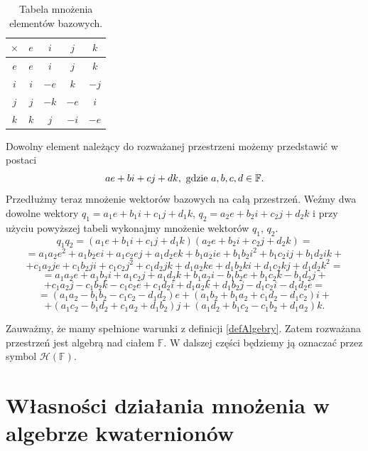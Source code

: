 \documentclass[a4paper,twoside,11pt,reqno]{mwrep}
\theoremstyle{plain} \newtheorem{twr}{Twierdzenie}
\theoremstyle{plain} \newtheorem{lem}{Lemat}
\theoremstyle{definition} \newtheorem{defi}{Definicja}
\theoremstyle{remark} \newtheorem*{wni}{Wniosek}
\theoremstyle{definition} \newtheorem{uwaga}{Uwaga}
\theoremstyle{definition}\newtheorem{prz}{Przykład}
\begin{document}
\begin{table}[h]
    \centering
      \caption{\label{table}Tabela mnożenia elementów bazowych.}
    \begin{tabular}{|c|c|c|c|c|}
        \hline
        \rowcolor{gray}$\times$ & $e$&$i$& $j$& $k$\\\hline 
         \cellcolor{gray}$e$&\cellcolor{gray!25}$e$&\cellcolor{gray!25}$i$
         &\cellcolor{gray!25}$j$&\cellcolor{gray!25}$k$\\ \hline
         \cellcolor{gray}$i$&\cellcolor{gray!25}$i$&\cellcolor{gray!25}$-e$&
         \cellcolor{gray!25}$k$&\cellcolor{gray!25}$-j$\\ \hline
         \cellcolor{gray}$j$&\cellcolor{gray!25}$j$&\cellcolor{gray!25}$-k$&\cellcolor{gray!25}$-e$&\cellcolor{gray!25}$i$\\ \hline
         \cellcolor{gray}$k$&\cellcolor{gray!25}$k$&\cellcolor{gray!25}$j$&
         \cellcolor{gray!25}$-i$&\cellcolor{gray!25}$-e$\\ \hline
    \end{tabular}

\end{table}


\noindent
Dowolny element należący do rozważanej przestrzeni możemy przedstawić w postaci
$$ae+bi+cj+dk,\textup{ gdzie }a,b,c,d\in\mathbb{F}.$$ 
Przedłużmy teraz mnożenie wektorów bazowych na całą przestrzeń. Weźmy dwa dowolne wektory 
$q_1=a_1e +b_1 i +c_1j +d_1 k$, $q_2=a_2e +b_2 i +c_2j +d_2 k$ i przy użyciu powyższej tabeli wykonajmy mnożenie wektorów $q_1$, $q_2$. 
$$q_1q_2 = (a_1e +b_1 i +c_1j +d_1 k)(a_2e +b_2 i +c_2j +d_2 k)=$$
$$=a_1a_2 e^2 +a_1b_2ei +a_1c_2ej+a_1d_2ek+b_1a_2 ie +b_1b_2i^2 +b_1c_2ij+b_1d_2ik +$$
$$+c_1a_2je +c_1b_2ji +c_1c_2j^2+c_1d_2jk+d_1a_2 ke +d_1b_2ki +d_1c_2kj+d_1d_2k^2=$$
$$=a_1a_2 e +a_1b_2i +a_1c_2j+a_1d_2k+b_1a_2 i -b_1b_2e +b_1c_2k-b_1d_2j +$$
$$+c_1a_2j -c_1b_2k -c_1c_2e+c_1d_2i+d_1a_2 k +d_1b_2j -d_1c_2i-d_1d_2e=$$
$$= (a_1 a_2-b_1b_2-c_1c_2-d_1d_2)e+(a_1b_2+b_1a_2+c_1d_2-d_1c_2)i+$$
$$+(a_1c_2-b_1d_2+c_1a_2+d_1b_2)j+(a_1d_2+b_1c_2-c_1b_2+d_1a_2)k.$$

Zauważmy, że mamy spełnione warunki z definicji \ref{defAlgebry}. Zatem rozważana przestrzeń jest algebrą nad
ciałem $\mathbb{F}$. W dalszej części będziemy ją oznaczać przez symbol $\mathcal{H}\left(  \mathbb{F}\right)$.



\section{Własności działania mnożenia w algebrze kwaternionów}
\end{document}
